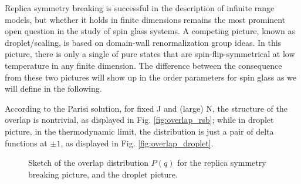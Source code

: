 Replica symmetry breaking is successful in the description of infinite range models, but whether it 
holds in finite dimensions remains the most prominent open question in the study of spin glass systems. 
A competing picture, known as droplet/scaling\cite{Fisher-Huse-1987,Fisher-Huse-1988}, 
is based on domain-wall 
renormalization group ideas. In this picture, there is only a single of
pure states that are spin-flip-symmetrical at low temperature in any finite 
dimension. The difference between the consequence from these two pictures 
will show up in the order parameters for spin glass as we will define in the following.

According to the Parisi solution, for fixed J and (large) N, the structure of 
the overlap is nontrivial, as displayed in Fig. \ref{fig:overlap_rsb}; while in droplet picture, in the thermodynamic limit, 
the distribution is just a pair of delta functions at $\pm 1$, as displayed in 
Fig. \ref{fig:overlap_droplet}.

\begin{figure}
  \centering 
  \hspace{0.5cm}
  \caption{Sketch of the overlap distribution $P(q)$ for the replica symmetry 
breaking picture, and the droplet picture.}
  \label{fig:overlap}
\end{figure}

